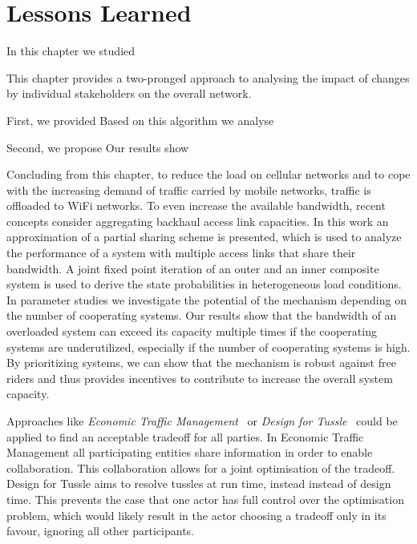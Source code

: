 \section{Lessons Learned}\label{sec:aggregation:lessonslearned}
In this chapter we studied

This chapter provides a two-pronged approach to analysing the impact of changes by individual stakeholders on the overall network.

First, we provided
Based on this algorithm we analyse

Second, we propose
Our results show

Concluding from this chapter, to reduce the load on cellular networks and to cope with the increasing demand of traffic carried by mobile networks, traffic is offloaded to WiFi networks.
To even increase the available bandwidth, recent concepts consider aggregating backhaul access link capacities.
In this work an approximation of a partial sharing scheme is presented, which is used to analyze the performance of a system with multiple access links that share their bandwidth. A joint fixed point iteration of an outer and an inner composite system is used to derive the state probabilities in heterogeneous load conditions.
In parameter studies we investigate the potential of the mechanism depending on the number of cooperating systems.
Our results show that the bandwidth of an overloaded system can exceed its capacity multiple times if the cooperating systems are underutilized, especially if the number of cooperating systems is high.
By prioritizing systems, we can show that the mechanism is robust against free riders and thus provides incentives to contribute to increase the overall system capacity.

Approaches like \emph{Economic Traffic Management}~\cite{spirou2009} or \emph{Design for Tussle}~\cite{trilogy2008} could be applied to find
an acceptable tradeoff for all parties.
In Economic Traffic Management all participating entities share information in order to enable collaboration.
This collaboration allows for a joint optimisation of the tradeoff.
Design for Tussle aims to resolve tussles at run time, instead instead of design time.
This prevents the case that one actor has full control over the optimisation problem, which would likely result in the actor choosing a tradeoff only in its favour, ignoring all other participants.
